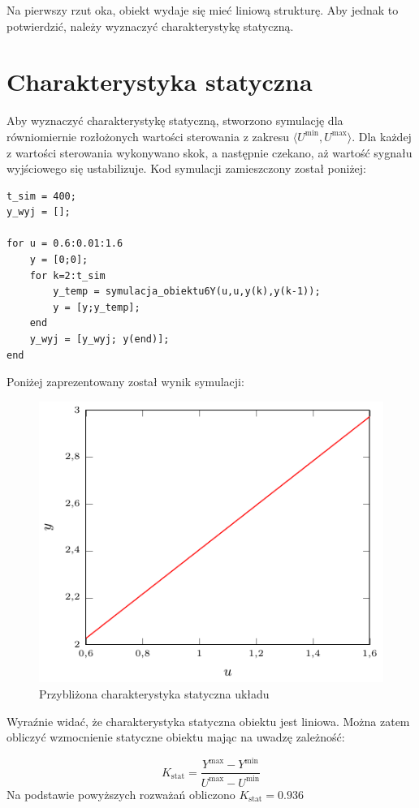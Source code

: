 \par Na pierwszy rzut oka, obiekt wydaje się mieć liniową strukturę. Aby jednak to potwierdzić, należy wyznaczyć charakterystykę statyczną.


\section{Charakterystyka statyczna}
Aby wyznaczyć charakterystykę statyczną, stworzono symulację dla równiomiernie rozłożonych wartości sterowania z zakresu $ \langle  U^{\textrm{min}}, U^{\textrm{max}}\rangle $. Dla każdej z wartości sterowania wykonywano skok, a następnie czekano, aż wartość sygnału wyjściowego się ustabilizuje. Kod symulacji zamieszczony został poniżej:

\begin{lstlisting}[style=Matlab-editor]
t_sim = 400;
y_wyj = [];

for u = 0.6:0.01:1.6
    y = [0;0];
    for k=2:t_sim
        y_temp = symulacja_obiektu6Y(u,u,y(k),y(k-1));
        y = [y;y_temp];
    end
    y_wyj = [y_wyj; y(end)];
end
\end{lstlisting}

Poniżej zaprezentowany został wynik symulacji:
\begin{figure}[h] 
\centering 
\includegraphics[scale=1.4]{wykresy/zad1_2/char_stat.pdf} 
\caption{Przybliżona charakterystyka statyczna układu} 
\end{figure}
Wyraźnie widać, że charakterystyka statyczna obiektu jest liniowa. Można zatem obliczyć wzmocnienie statyczne obiektu mając na uwadzę zależność:

\begin{equation}
K_{\textrm{stat}} = \frac{Y^{\textrm{max}} - Y^{\textrm{min}}}{U^{\textrm{max}} - U^{\textrm{min}}}
\end{equation}
Na podstawie powyższych rozważań obliczono $K_{\textrm{stat}} = \num{0.936}$



